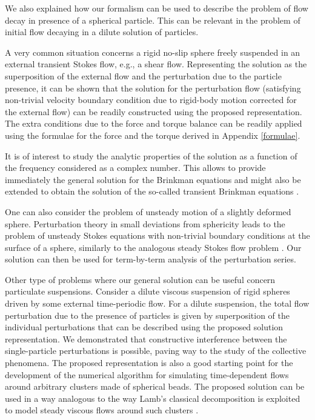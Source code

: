 \documentclass[aps,prx,twocolumn,amsmath,amssymb,amsfonts]{revtex4-2}
\begin{document}
{{We also explained how our formalism can be used to describe the problem of flow decay in presence of a spherical particle. This can be relevant in the problem of initial flow decaying in a dilute solution of particles.

A very common situation concerns a rigid no-slip sphere freely suspended in an external transient Stokes flow, e.g., a shear flow. Representing the solution as the superposition of the external flow and the perturbation due to the particle presence, it can be shown that the solution for the perturbation flow (satisfying non-trivial velocity boundary condition due to rigid-body motion corrected for the external flow) can be readily constructed using the proposed representation. The extra conditions due to the force and torque balance can be readily applied using the formulae for the force and the torque derived in Appendix \ref{formulae}.

It is of interest to study the analytic properties of the solution as a function of the frequency considered as a complex number. This allows to provide immediately the general solution for the Brinkman equations and might also be extended to obtain the solution of the so-called transient Brinkman equations \cite{pala}.

One can also consider the problem of unsteady motion of a slightly deformed sphere. Perturbation theory in small deviations from sphericity leads to the problem of unsteady Stokes equations with non-trivial boundary conditions at the surface of a sphere, similarly to the analogous steady Stokes flow problem \cite{brsl,hb}. Our solution can then be used for term-by-term analysis of the perturbation series.

Other type of problems where our general solution can be useful concern particulate suspensions. Consider a dilute viscous suspension of rigid spheres driven by some external time-periodic flow. For a dilute suspension, the total flow perturbation due to the presence of particles is given by superposition of the individual perturbations that can be described using the proposed solution representation. We demonstrated that constructive interference between the single-particle perturbations is possible, paving way to the study of the collective phenomena. The proposed representation is also a good starting point for the development of the numerical algorithm for simulating time-dependent flows around arbitrary clusters made of spherical beads. The proposed solution can be used in a way analogous to the way Lamb's classical decomposition is exploited to model steady viscous flows around such clusters \cite{Fil}.

}}
\end{document}
